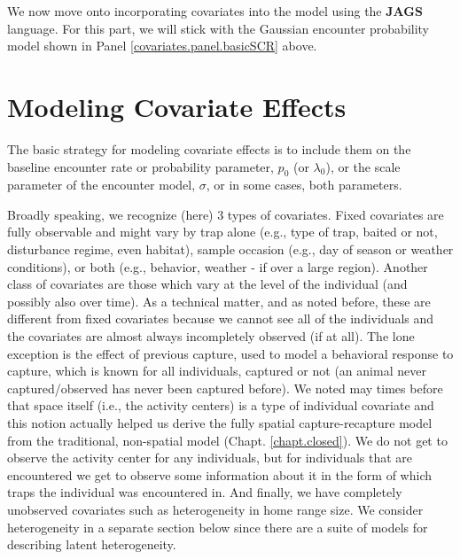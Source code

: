 We  now move onto incorporating
covariates into the model using the {\bf JAGS}
language.  For this part, we will stick with the Gaussian encounter
probability model
 shown in Panel \ref{covariates.panel.basicSCR} above.


\section{Modeling Covariate Effects}

The basic strategy for modeling covariate effects is to include them
on the baseline encounter rate or probability parameter, $p_{0}$ (or
$\lambda_{0}$), or the scale parameter of the encounter model,
$\sigma$, or in some cases, both parameters.

Broadly speaking, we recognize (here) 3 types of covariates. Fixed
covariates are fully observable and might vary by trap alone
(e.g., type of trap, baited or not, disturbance regime, even habitat),
sample occasion (e.g., day of season or weather conditions), or both
(e.g., behavior, weather - if over a large region).  Another class
of covariates are those which vary at the level of the individual (and
possibly also over time).  As a technical matter, and as noted before,
these are different from fixed covariates because we cannot see all of
the individuals and the covariates are almost always incompletely
observed (if at all).  The lone exception is the effect of previous
capture, used to model a behavioral response
to capture, which is known for all individuals, captured or not (an
animal never captured/observed has never been captured before).  We
noted may times before that space itself (i.e., the activity centers)
is a type of individual covariate and this notion actually helped us
derive the fully spatial capture-recapture model from the traditional,
non-spatial model (Chapt. \ref{chapt.closed}). We do not get to observe
the activity center for any individuals, but for individuals that are
encountered we get to observe some information about it in the form of
which traps the individual was encountered in.  And finally, we have
completely unobserved covariates such as heterogeneity in home range
size.  We consider heterogeneity in a separate section below since 
there are 
a suite of models for describing  latent heterogeneity. 

